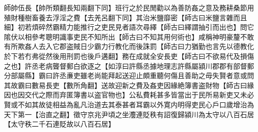 師帥伍長【帥所類翻長知兩翻下同】班行之於民閒勸以為善防姦之意及務耕桑節用殖財種樹畜養去浮淫之費【去羌呂翻下同】其治米鹽靡密【師古曰米鹽言雜而且細】初若煩碎然霸精力能推行之吏民見者語次尋繹【師古曰繹謂抽引而出也】問它隂伏以相參考聰明識事吏民不知所出【師古曰不知其用何術也】咸稱神明豪釐不敢有所欺姦人去入它郡盗賊日少霸力行教化而後誅罰【師古曰力猶勤也言先以德教化於下若冇弗從然後用刑罰也後戶遘翻】務在成就全安長吏【師古曰不欲易代及損傷之也】許丞老病聾督郵白欲逐之【如淳曰許縣丞據地理志許縣屬潁川郡郡有部督郵分部屬縣】霸曰許丞亷吏雖老尚能拜起送迎止頗重聽何傷且善助之毋失賢者意或問其故霸曰數易長吏【數所角翻】送故迎新之費及姦吏因緣絶簿書盗財物【師古曰緣因也因交代之際而弃匿簿書以盗官物也】公私費耗甚多皆當出于民所易新吏又未必賢或不如其故徒相益為亂凡治道去其泰甚者耳霸以外寛内明得吏民心戶口歲增治為天下第一【治直之翻】徵守京兆尹頃之坐灋連貶秩有詔復歸潁川為太守以八百石居【太守秩二千石連貶故以八百石居】

